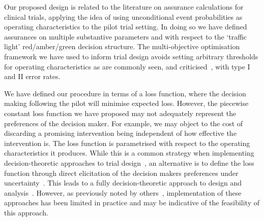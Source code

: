 \documentclass{article} %
\begin{document}
Our proposed design is related to the literature on assurance calculations for clinical trials, applying the idea of using unconditional event probabilities as operating characteristics to the pilot trial setting. In doing so we have defined assurances on multiple substantive parameters and with respect to the `traffic light' red/amber/green decision structure. The multi-objective optimisation framework we have used to inform trial design avoids setting arbitrary thresholds for operating characteristics as are commonly seen, and criticised~\cite{Bacchetti2010}, with type I and II error rates.

We have defined our procedure in terms of a loss function, where the decision making following the pilot will minimise expected loss. However, the piecewise constant loss function we have proposed may not adequately represent the preferences of the decision maker. For example, we may object to the cost of discarding a promising intervention being independent of how effective the intervention is. The loss function is parametrised with respect to the operating characteristics it produces. While this is a common strategy when implementing decision-theoretic approaches to trial design~\cite{Lewis2007}, an alternative is to define the loss function through direct elicitation of the decision makers preferences under uncertainty~\cite{French2000}. This leads to a fully decision-theoretic approach to design and analysis~\cite{Lindley1997}. However, as previously noted by others~\cite{Joseph1997a, Bacchetti2008, Whitehead2008}, implementation of these approaches has been limited in practice and may be indicative of the feasibility of this approach.




\end{document}
